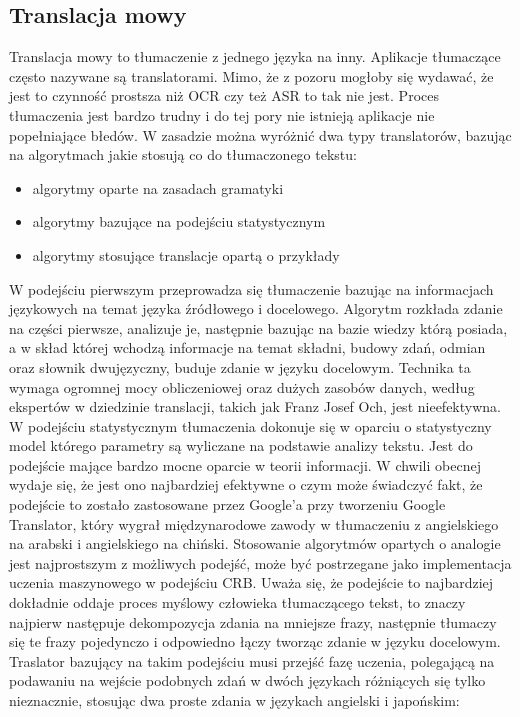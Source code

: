 \subsection{Translacja mowy}
Translacja mowy to tłumaczenie z jednego języka na inny. Aplikacje tłumaczące często nazywane są translatorami. Mimo, że z pozoru mogłoby się wydawać, że jest to czynność prostsza niż OCR czy też ASR to tak nie jest. Proces tłumaczenia jest bardzo trudny i do tej pory nie istnieją aplikacje nie popełniające błedów. W zasadzie można wyróżnić dwa typy translatorów, bazując na algorytmach jakie stosują co do tłumaczonego tekstu:
\begin{itemize}
	\item algorytmy oparte na zasadach gramatyki
	\item algorytmy bazujące na podejściu statystycznym
	\item algorytmy stosujące translacje opartą o przykłady
\end{itemize}
W podejściu pierwszym przeprowadza się tłumaczenie bazując na informacjach językowych na temat języka źródłowego i docelowego. Algorytm rozkłada zdanie na części pierwsze, analizuje je, następnie bazując na bazie wiedzy którą posiada, a w skład której wchodzą informacje na temat składni, budowy zdań, odmian oraz słownik dwujęzyczny, buduje zdanie w języku docelowym. Technika ta wymaga ogromnej mocy obliczeniowej oraz dużych zasobów danych, według ekspertów w dziedzinie translacji, takich jak Franz Josef Och, jest nieefektywna.
W podejściu statystycznym tłumaczenia dokonuje się w oparciu o statystyczny model którego parametry są wyliczane na podstawie analizy tekstu. Jest do podejście mające bardzo mocne oparcie w teorii informacji. W chwili obecnej wydaje się, że jest ono najbardziej efektywne o czym może świadczyć fakt, że podejście to zostało zastosowane przez Google'a przy tworzeniu Google Translator, który wygrał międzynarodowe zawody w tłumaczeniu z angielskiego na arabski i angielskiego na chiński.
Stosowanie algorytmów opartych o analogie jest najprostszym z możliwych podejść, może być postrzegane jako implementacja uczenia maszynowego w podejściu CRB. Uważa się, że podejście to najbardziej dokładnie oddaje proces myślowy człowieka tłumaczącego tekst, to znaczy najpierw następuje dekompozycja zdania na mniejsze frazy, następnie tłumaczy się te frazy pojedynczo i odpowiedno łączy tworząc zdanie w języku docelowym. Traslator bazujący na takim podejściu musi przejść fazę uczenia, polegającą na podawaniu na wejście podobnych zdań w dwóch językach różniących się tylko nieznacznie, stosując dwa proste zdania w językach angielski i japońskim: 

